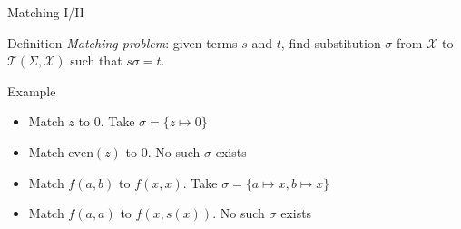 
\begin{frame}{Matching I/II}
\begin{block}{Definition}
    \textit{Matching problem}: given terms $s$ and $t$, find substitution $\sigma$ from $\mathcal{X}$ to $\mathcal{T}(\Sigma, \mathcal{X})$ such that $s\sigma = t$.
\end{block}

\begin{block}{Example}
\begin{itemize}
    \item Match $z$ to $0$. Take $\sigma = \{z \mapsto 0\}$
    \item Match $\text{even}(z)$ to $0$. No such $\sigma$ exists
    \item Match $f(a, b)$ to $f(x, x)$. Take $\sigma = \{a \mapsto x, b \mapsto x\}$
    \item Match $f(a, a)$ to $f(x, s(x))$. No such $\sigma$ exists
\end{itemize}

\end{block}
\end{frame}

